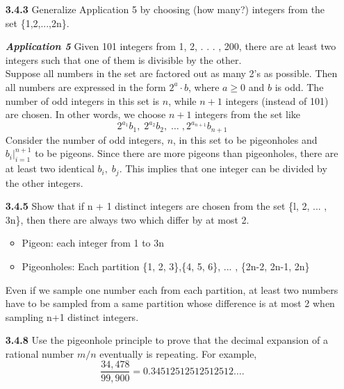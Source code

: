 \documentclass[12pt]{article}
\begin{document}


\begin{enumerate}
    \item[\bf 3.4.3] Generalize Application 5 by choosing (how many?) integers from the set \{1,2,...,2n\}.
    
    \vspace{0.1\baselineskip}
    \textbf{\textit{Application 5 }}Given 101 integers from 1, 2, . . . , 200, there are at least two integers such that one of them is divisible by the other.\\
    
    Suppose all numbers in the set are factored out as many 2's as possible. Then all numbers are expressed in the form $2^a\cdot b$, where $a\ge 0$ and $b$ is odd. The number of odd integers in this set is $n$, while $n+1$ integers (instead of 101) are chosen. In other words, we choose $n+1$ integers from the set like
    $$2^{a_1}b_1,\; 2^{a_2}b_2,\;\ldots\;, 2^{a_{n+1}}b_{n+1}$$
    Consider the number of odd integers, $n$, in this set to be pigeonholes and $b_i|_{i=1}^{n+1}$ to be pigeons. Since there are more pigeons than pigeonholes, there are at least two identical $b_i,\;b_j$. This implies that one integer can be divided by the other integers. \\
    
    \item[\bf 3.4.5] Show that if n + 1 distinct integers are chosen from the set \{l, 2, ... , 3n\}, then there are always two which differ by at most 2.\\
    \begin{itemize}
        \item Pigeon: each integer from 1 to 3n
        \item Pigeonholes: Each partition \{1, 2, 3\},\{4, 5, 6\}, ... , \{2n-2, 2n-1, 2n\}
    \end{itemize}
    Even if we sample one number each from each partition, at least two numbers have to be sampled from a same partition whose difference is at most 2 when sampling n+1 distinct integers.\\
    
    \item[\bf 3.4.8] Use the pigeonhole principle to prove that the decimal expansion of a rational number $m/n$ eventually is repeating. For example,
    $$\frac{34,478}{99,900} = 0.34512512512512512\ldots .$$\\
    

\end{enumerate}
\end{document}
